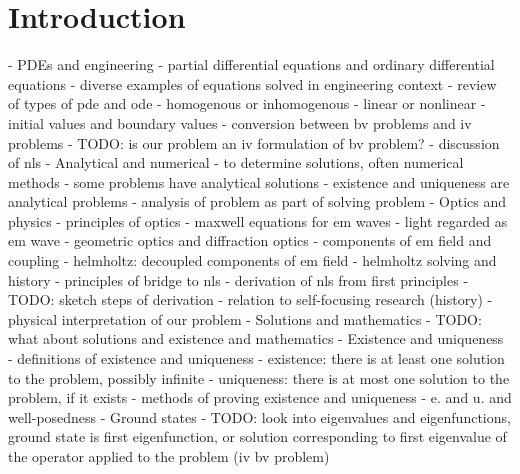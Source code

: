 \section{Introduction}

- PDEs and engineering
  - partial differential equations and ordinary differential equations
  - diverse examples of equations solved in engineering context
  - review of types of pde and ode
    - homogenous or inhomogenous
    - linear or nonlinear
    - initial values and boundary values
      - conversion between bv problems and iv problems
      - TODO: is our problem an iv formulation of bv problem?
  - discussion of nls
- Analytical and numerical
  - to determine solutions, often numerical methods
  - some problems have analytical solutions
  - existence and uniqueness are analytical problems
  - analysis of problem as part of solving problem
- Optics and physics
  - principles of optics
    - maxwell equations for em waves
    - light regarded as em wave
    - geometric optics and diffraction optics
    - components of em field and coupling
    - helmholtz: decoupled components of em field
    - helmholtz solving and history
    - principles of bridge to nls
  - derivation of nls from first principles
    - TODO: sketch steps of derivation
  - relation to self-focusing research (history)
  - physical interpretation of our problem
- Solutions and mathematics
  - TODO: what about solutions and existence and mathematics
- Existence and uniqueness
  - definitions of existence and uniqueness
    - existence: there is at least one solution to the problem, possibly infinite
    - uniqueness: there is at most one solution to the problem, if it exists
  - methods of proving existence and uniqueness
  - e. and u. and well-posedness
- Ground states
  - TODO: look into eigenvalues and eigenfunctions, ground state is first eigenfunction, or solution corresponding to first eigenvalue of the operator applied to the problem (iv bv problem)


